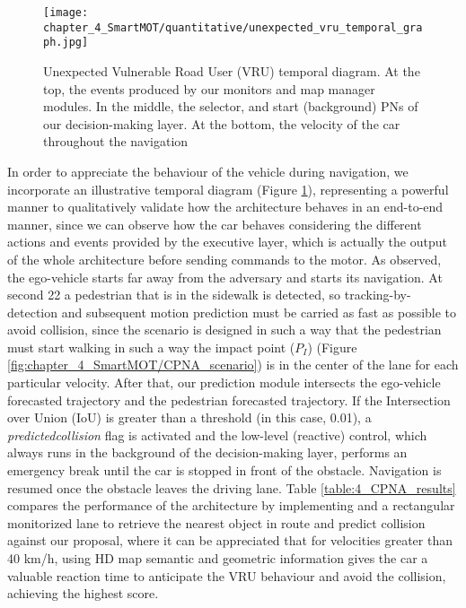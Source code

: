 \begin{figure}[h]
	\centering
	\texttt{[image: chapter\_4\_SmartMOT/quantitative/unexpected\_vru\_temporal\_graph.jpg]}
	\captionsetup{justification=justified}
	\caption[Unexpected Vulnerable Road User (VRU) temporal diagram]{Unexpected Vulnerable Road User (VRU) temporal diagram. At the top, the events produced by our monitors and map manager modules. In the middle, the selector, and start (background) PNs of our decision-making layer. At the bottom, the velocity of the car throughout the navigation}
	\label{fig:chapter_4_SmartMOT/quantitative/unexpected_vru_temporal_graph}
\end{figure}

In order to appreciate the behaviour of the vehicle during navigation, we incorporate an illustrative temporal diagram (Figure \ref{fig:chapter_4_SmartMOT/quantitative/unexpected_vru_temporal_graph}), representing a powerful manner to qualitatively validate how the architecture behaves in an end-to-end manner, since we can observe how the car behaves considering the different actions and events \cite{gomez2021train} provided by the executive layer, which is actually the output of the whole architecture before sending commands to the motor. As observed, the ego-vehicle starts far away from the adversary and starts its navigation. At second 22 a pedestrian that is in the sidewalk is detected, so tracking-by-detection and subsequent motion prediction must be carried as fast as possible to avoid collision, since the scenario is designed in such a way that the pedestrian must start walking in such a way the impact point (\(P_I\)) (Figure \ref{fig:chapter_4_SmartMOT/CPNA_scenario}) is in the center of the lane for each particular velocity. After that, our prediction module intersects the ego-vehicle forecasted trajectory and the pedestrian forecasted trajectory. If the Intersection over Union (IoU) is greater than a threshold (in this case, 0.01), a \textit{predictedcollision} flag is activated and the low-level (reactive) control, which always runs in the background of the decision-making layer, performs an emergency break until the car is stopped in front of the obstacle. Navigation is resumed once the obstacle leaves the driving lane. Table \ref{table:4_CPNA_results} compares the performance of the architecture by implementing \cite{gomez2020real} and a rectangular monitorized lane to retrieve the nearest object in route and predict collision against our proposal, where it can be appreciated that for velocities greater than 40 km/h, using HD map semantic and geometric information gives the car a valuable reaction time to anticipate the VRU behaviour and avoid the collision, achieving the highest score. 

